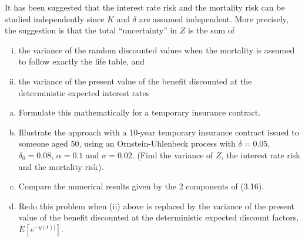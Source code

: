 \documentclass[12pt]{article}
\numberwithin{questioncounter}{section}
\begin{document}
\begin{question}
It has been suggested that the interest rate risk and the mortality risk can be studied independently since $K$ and $\delta$ are assumed independent. More precisely, the suggestion is that the total ``uncertainty'' in $Z$ is the sum of

\begin{enumerate}[(i)]
\item the variance of the random discounted values when the mortality is assumed to follow exactly the life table, and
\item the variance of the present value of the benefit discounted at the deterministic expected interest rates
\end{enumerate}

\begin{enumerate}[(a)]
\item Formulate this mathematically for a temporary insurance contract.
\item Illustrate the approach with a 10-year temporary insurance contract issued to someone aged 50, using an Ornstein-Uhlenbeck process with $\delta = 0.05$, $\delta_{0} = 0.08$, $\alpha = 0.1$ and $\sigma = 0.02$. (Find the variance of $Z$, the interest rate risk and the mortality risk).
\item Compare the numerical results given by the 2 components of (3.16).
\item Redo this problem when (ii) above is replaced by the variance of the present value of the benefit discounted at the deterministic expected discount factors, $E[e^{-y(t)]}]$.
\end{enumerate}

\end{question}
\end{document}

